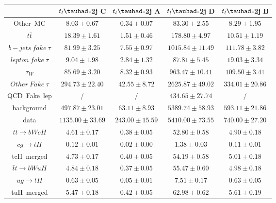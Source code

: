 \centering
\begin{tabular}{|c|c|c|c|c|} \hline
 & $t_{l}\tauhad$-2j C & $t_{l}\tauhad$-2j A & $t_{l}\tauhad$-2j D & $t_{l}\tauhad$-2j B\\\hline
Other~MC & $8.03\pm0.67$ & $0.34\pm0.07$ & $83.30\pm2.55$ & $8.29\pm1.95$\\\hline
$t\bar{t}$ & $18.39\pm1.61$ & $1.51\pm0.46$ & $178.80\pm4.97$ & $10.51\pm1.19$\\\hline
$b-jets~fake~\tau$ & $81.99\pm3.25$ & $7.55\pm0.97$ & $1015.84\pm11.49$ & $111.78\pm3.82$\\\hline
$lepton~fake~\tau$ & $9.04\pm1.98$ & $2.84\pm1.32$ & $87.81\pm5.45$ & $19.03\pm3.34$\\\hline
$\tau_{W}$ & $85.69\pm3.20$ & $8.32\pm0.93$ & $963.47\pm10.41$ & $109.50\pm3.41$\\\hline
$Other~Fake~\tau$ & $294.73\pm22.40$ & $42.55\pm8.72$ & $2625.87\pm49.02$ & $334.01\pm20.86$\\\hline
QCD~Fake~lep &  / &  / & $434.65\pm27.74$ &  /\\\hline
background & $497.87\pm23.01$ & $63.11\pm8.93$ & $5389.74\pm58.93$ & $593.11\pm21.86$\\\hline
data & $1135.00\pm33.69$ & $243.00\pm15.59$ & $5410.00\pm73.55$ & $740.00\pm27.20$\\\hline
$\bar{t}t\to bWcH$ & $4.61\pm0.17$ & $0.38\pm0.05$ & $52.80\pm0.58$ & $4.90\pm0.18$\\\hline
$cg\to tH$ & $0.12\pm0.01$ & $0.02\pm0.00$ & $1.38\pm0.03$ & $0.11\pm0.01$\\\hline
tcH~merged & $4.73\pm0.17$ & $0.40\pm0.05$ & $54.19\pm0.58$ & $5.01\pm0.18$\\\hline
$\bar{t}t\to bWuH$ & $4.84\pm0.18$ & $0.37\pm0.05$ & $55.47\pm0.60$ & $4.98\pm0.18$\\\hline
$ug\to tH$ & $0.63\pm0.05$ & $0.05\pm0.01$ & $7.51\pm0.17$ & $0.63\pm0.05$\\\hline
tuH~merged & $5.47\pm0.18$ & $0.42\pm0.05$ & $62.98\pm0.62$ & $5.61\pm0.19$\\\hline
\end{tabular}
